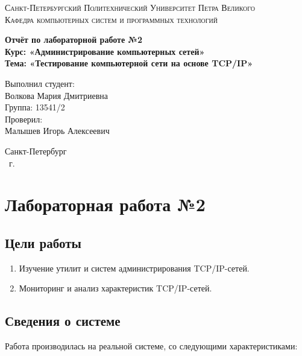 \documentclass[14pt,a4paper,report]{report}
\begin{document}
\def\contentsname{Содержание}

\begin{titlepage}
	\begin{center}
		\textsc{Санкт-Петербургский Политехнический 
			Университет Петра Великого\\[5mm]
			Кафедра компьютерных систем и программных технологий}
		
		\vfill
		
		\textbf{Отчёт по лабораторной работе №2\\[3mm]
			Курс: «Администрирование компьютерных сетей»\\[3mm]
			Тема: «Тестирование компьютерной сети на основе TCP/IP»\\[35mm]
			}
	\end{center}
	
	\hfill
	\begin{minipage}{.5\textwidth}
		Выполнил студент:\\[2mm] 
		Волкова Мария Дмитриевна\\
		Группа: 13541/2\\[5mm]
		
		Проверил:\\[2mm] 
		Малышев Игорь Алексеевич
	\end{minipage}
	\vfill
	\begin{center}
		Санкт-Петербург\\ \the\year\ г.
	\end{center}
\end{titlepage}

\tableofcontents
\clearpage
\chapter{Лабораторная работа №2}
\section{Цели работы}
\begin{enumerate}
\item Изучение утилит и систем администрирования TCP/IP-сетей.
\item Мониторинг и анализ характеристик TCP/IP-сетей.
\end{enumerate}

\section{Сведения о системе}
Работа производилась на реальной системе, со следующими характеристиками:
\end{document}
